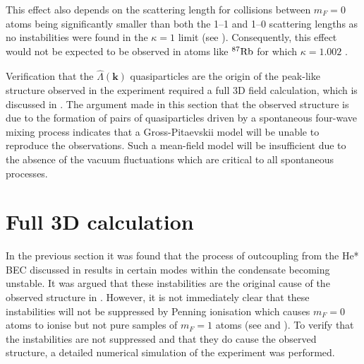 This effect also depends on the scattering length for collisions between $m_F=0$ atoms being significantly smaller than both the 1--1 and 1--0 scattering lengths as no instabilities were found in the $\kappa = 1$ limit (see ). 
Consequently, this effect would not be expected to be observed in atoms like $\nucl{87}{}{Rb}$ for which $\kappa = 1.002$ \citep{Kempen:2002,Widera:2006}.

Verification that the $\hat{\Lambda}(\bm{k})$ quasiparticles are the origin of the peak-like structure observed in the experiment required a full 3D field calculation, which is discussed in .  The argument made in this section that the observed structure is due to the formation of pairs of quasiparticles driven by a spontaneous four-wave mixing process indicates that a Gross-Pitaevskii model will be unable to reproduce the observations. Such a mean-field model will be insufficient due to the absence of the vacuum fluctuations which are critical to all spontaneous processes.

\section{Full 3D calculation}
\label{Peaks:3DCalculation}
In the previous section it was found that the process of outcoupling from the He* BEC discussed in  results in certain modes within the condensate becoming unstable. It was argued that these instabilities are the original cause of the observed structure in . However, it is not immediately clear that these instabilities will not be suppressed by Penning ionisation which causes $m_F=0$ atoms to ionise but not pure samples of $m_F=1$ atoms (see  and ). To verify that the instabilities are not suppressed and that they do cause the observed structure, a detailed numerical simulation of the experiment was performed.

